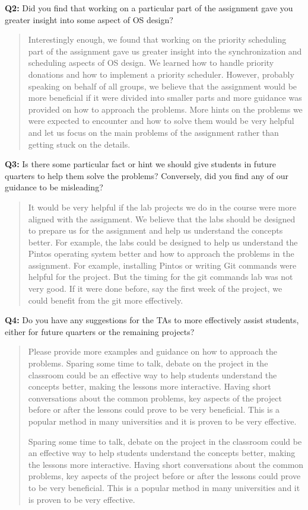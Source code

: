 \documentclass[a4paper,11pt]{paper}
\begin{document}
\textbf{Q2:} Did you find that working on a particular part of the assignment gave you greater insight into some aspect of OS design?
\begin{quote}
 Interestingly enough, we found that working on the priority scheduling part of the
	assignment gave us greater insight into the synchronization and scheduling aspects
	of OS design. We learned how to handle priority donations and how to implement
	a priority scheduler. However, probably speaking on behalf of all groups, we
	believe that the assignment would be more beneficial if it were divided into smaller
	parts and more guidance was provided on how to approach the problems. More hints on
	the problems we were expected to encounter and how to solve them would be very
	helpful and let us focus on the main problems of the assignment rather than getting
	stuck on the details.
\end{quote}

\textbf{Q3:} Is there some particular fact or hint we should give students in future quarters to help them solve the problems?  Conversely, did you find any of our guidance to be misleading?
\begin{quote}
   It would be very helpful if the lab projects we do in the course were more
	aligned with the assignment. We believe that the labs should be designed to
	prepare us for the assignment and help us understand the concepts better. For
	example, the labs could be designed to help us understand the Pintos operating
	system better and how to approach the problems in the assignment. For example,
	installing Pintos or writing Git commands were helpful for the project. But
	the timing for the git commands lab was not very good. If it were done before,
	say the first week of the project, we could benefit from the git more effectively.
\end{quote}

\textbf{Q4:} Do you have any suggestions for the TAs to more effectively assist students, either for future quarters or the remaining projects?
\begin{quote}
  Please provide more examples and guidance on how to approach the problems.
	Sparing some time to talk, debate on the project in the classroom could be
	an effective way to help students understand the concepts better, making the lessons
	more interactive. Having short conversations about the common problems, key aspects
	of the project before or after the lessons could prove to be very beneficial.
	This is a popular method in many universities and it is proven to be very effective.

    Sparing some time to talk, debate on the project in the classroom could be
	an effective way to help students understand the concepts better, making the lessons
	more interactive. Having short conversations about the common problems, key aspects
	of the project before or after the lessons could prove to be very beneficial.
	This is a popular method in many universities and it is proven to be very effective.
\end{quote}
\end{document}
